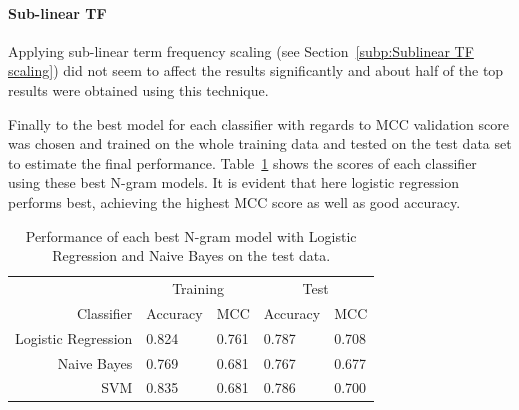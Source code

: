 \paragraph{Sub-linear TF}
\label{par:Sub-linear TF}
Applying sub-linear term frequency scaling (see Section~\ref{subp:Sublinear TF scaling}) did not seem to affect the results significantly and about half of the top results were obtained using this technique.
\bigskip

Finally to the best model for each classifier with regards to \gls{MCC} validation score was chosen and trained on the whole training data and tested on the test data set to estimate the final performance. Table~\ref{tab:Ngram Grid Search Scores} shows the scores of each classifier using these best N-gram models. It is evident that here logistic regression performs best, achieving the highest \gls{MCC} score as well as good accuracy.

\begin{table}
  \begin{center}
  \begin{tabular}{ r | *2l | *2l }
    \toprule
     & \multicolumn{2}{c|}{Training} & \multicolumn{2}{c}{Test}\\
    Classifier & Accuracy & MCC & Accuracy & MCC \\
    \midrule
    Logistic Regression & 0.824 & 0.761 & 0.787 & 0.708 \\
    Naive Bayes         & 0.769 & 0.681 & 0.767 & 0.677 \\
    SVM                 & 0.835 & 0.681 & 0.786 & 0.700 \\
    \bottomrule
  \end{tabular}
  \caption{Performance of each best N-gram model with Logistic Regression and Naive Bayes on the test data.}
\label{tab:Ngram Grid Search Scores}
\end{center}
\end{table}

